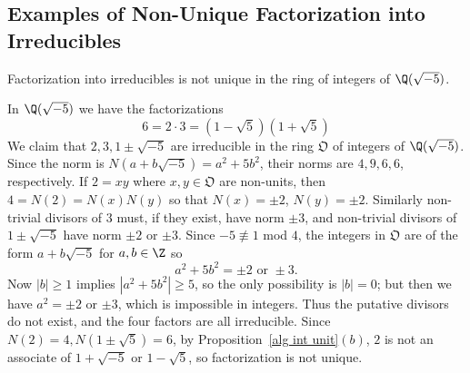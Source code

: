 \subsection{Examples of Non-Unique Factorization into Irreducibles}
\begin{example}
Factorization into irreducibles is not unique in the ring of integers of $\Q(\sqrt{-5})$.\par
In $\Q(\sqrt{-5})$ we have the factorizations
\[6=2\cdot 3=(1-\sqrt{5})(1+\sqrt{5})\]
We claim that $2,3,1\pm\sqrt{-5}$ are irreducible in the ring $\mathfrak{O}$ of integers of $\Q(\sqrt{-5})$. Since the norm is $N(a+b\sqrt{-5})=a^2+5b^2$, their norms are $4,9,6,6$, respectively. If $2=xy$ where $x,y\in\mathfrak{O}$ are non-units, then $4=N(2)=N(x)N(y)$ so that $N(x)=\pm2$, $N(y)=\pm2$. Similarly non-trivial divisors of $3$ must, if they exist, have norm $\pm 3$, and non-trivial divisors of $1\pm\sqrt{-5}$ have norm $ \pm 2$ or $\pm 3$. Since $-5\not\equiv1$ mod $4$, the integers in $\mathfrak{O}$ are of the form $a+b\sqrt{-5}$ for $a,b\in\Z$ so
\[a^2+5b^2=\pm 2\text{ or }\pm 3.\]
Now $|b|\geq1$ implies $|a^2+5b^2|\geq5$, so the only possibility is $|b|=0$; but then we have $a^2=\pm2$ or $\pm3$, which is impossible in integers. Thus the putative divisors do not exist, and the four factors are all irreducible. Since $N(2)=4,N(1\pm\sqrt{5})=6$, by Proposition~\ref{alg int unit}$(b)$, $2$ is not an associate of $1+\sqrt{-5}$ or $1-\sqrt{5}$, so factorization is not unique.
\end{example}
